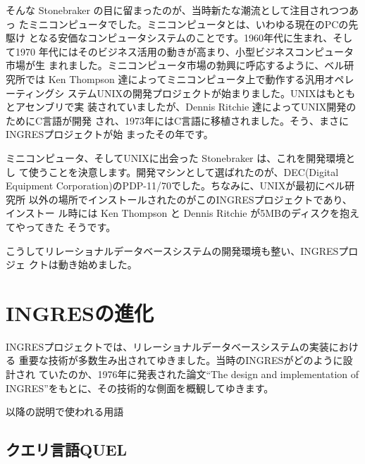 そんな Stonebraker の目に留まったのが、当時新たな潮流として注目されつつあっ
たミニコンピュータでした。ミニコンピュータとは、いわゆる現在のPCの先駆け
となる安価なコンピュータシステムのことです。1960年代に生まれ、そして1970
年代にはそのビジネス活用の動きが高まり、小型ビジネスコンピュータ市場が生
まれました。ミニコンピュータ市場の勃興に呼応するように、ベル研究所では
Ken Thompson 達によってミニコンピュータ上で動作する汎用オペレーティングシ
ステムUNIXの開発プロジェクトが始まりました。UNIXはもともとアセンブリで実
装されていましたが、Dennis Ritchie 達によってUNIX開発のためにC言語が開発
され、1973年にはC言語に移植されました。そう、まさにINGRESプロジェクトが始
まったその年です。


ミニコンピュータ、そしてUNIXに出会った Stonebraker は、これを開発環境とし
て使うことを決意します。開発マシンとして選ばれたのが、DEC(Digital
Equipment Corporation)のPDP-11/70でした。ちなみに、UNIXが最初にベル研究所
以外の場所でインストールされたのがこのINGRESプロジェクトであり、インストー
ル時には Ken Thompson と Dennis Ritchie が5MBのディスクを抱えてやってきた
そうです。


こうしてリレーショナルデータベースシステムの開発環境も整い、INGRESプロジェ
クトは動き始めました。


\section{INGRESの進化}


INGRESプロジェクトでは、リレーショナルデータベースシステムの実装における
重要な技術が多数生み出されてゆきました。当時のINGRESがどのように設計され
ていたのか、1976年に発表された論文``The design and implementation of
INGRES''をもとに、その技術的な側面を概観してゆきます。


\begin{center}
 \begin{minipage}{0.95\textwidth}
  \begin{screen}
   以降の説明で使われる用語


   \footnotesize




  \end{screen}
 \end{minipage}
 \vspace*{0.6\Cvs}
\end{center}


\subsection{クエリ言語QUEL}


